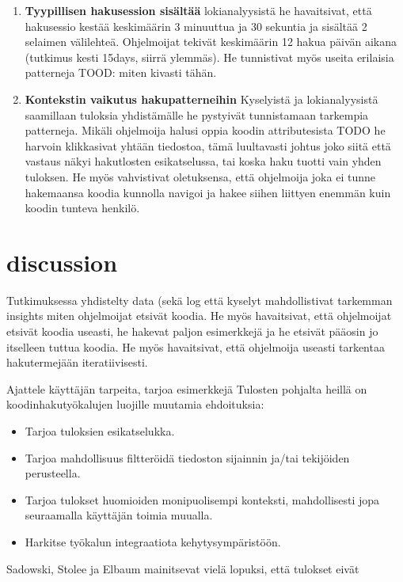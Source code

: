 \documentclass[finnish]{../tktltiki2}
\theoremstyle{definition}
\theoremstyle{remark}
\begin{document}
\begin{enumerate}
  \item {\bf Tyypillisen hakusession sisältää}
    lokianalyysistä he havaitsivat, että hakusessio kestää keskimäärin 3 minuuttua ja 30 sekuntia ja sisältää 2 selaimen välilehteä. Ohjelmoijat tekivät keskimäärin 12 hakua päivän aikana (tutkimus kesti 15days, siirrä ylemmäs). He tunnistivat myös useita erilaisia patterneja TOOD: miten kivasti tähän.

  \item {\bf Kontekstin vaikutus hakupatterneihin}
    Kyselyistä ja lokianalyysistä saamillaan tuloksia yhdistämälle he pystyivät tunnistamaan tarkempia patterneja. Mikäli ohjelmoija halusi oppia koodin attributesista TODO he harvoin klikkasivat yhtään tiedostoa, tämä luultavasti johtus joko siitä että vastaus näkyi hakutlosten esikatselussa, tai koska haku tuotti vain yhden tuloksen. He myös vahvistivat oletuksensa, että ohjelmoija joka ei tunne hakemaansa koodia kunnolla navigoi ja hakee siihen liittyen enemmän kuin koodin tunteva henkilö.

\end{enumerate}

\section{discussion}
Tutkimuksessa yhdistelty data (sekä log että kyselyt mahdollistivat tarkemman insights miten ohjelmoijat etsivät koodia. He myös havaitsivat, että ohjelmoijat etsivät koodia useasti, he hakevat paljon esimerkkejä ja he etsivät pääosin jo itselleen tuttua koodia. He myös havaitsivat, että ohjelmoija useasti tarkentaa hakutermejään iteratiivisesti.

Ajattele käyttäjän tarpeita, tarjoa esimerkkejä
Tulosten pohjalta heillä on koodinhakutyökalujen luojille muutamia ehdoituksia:
\begin{itemize}
    \item Tarjoa tuloksien esikatselukka.
    \item Tarjoa mahdollisuus filtteröidä tiedoston sijainnin ja/tai tekijöiden perusteella.
    \item Tarjoa tulokset huomioiden monipuolisempi konteksti, mahdollisesti jopa seuraamalla käyttäjän toimia muualla.
    \item Harkitse työkalun integraatiota kehytysympäristöön.
\end{itemize}


Sadowski, Stolee ja Elbaum mainitsevat vielä lopuksi, että tulokset eivät
\end{document}
